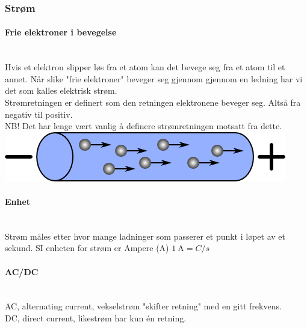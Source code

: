 \subsubsection{Strøm}
\paragraph{Frie elektroner i bevegelse} \mbox{} \\
Hvis et elektron slipper løs fra et atom kan det bevege seg fra et atom til et annet.
Når slike "frie elektroner" beveger seg gjennom gjennom en ledning
har vi det som kalles elektrisk strøm.
\\

Strømretningen er definert som den retningen elektronene beveger seg.
Altså fra negativ til positiv.\\
NB! Det har lenge vært vanlig å definere strømretningen motsatt fra dette.
\\
\includegraphics[scale=0.5]{./img/current}

\paragraph{Enhet} \mbox{} \\
Strøm måles etter hvor mange ladninger som passerer et punkt
i løpet av et sekund.
SI enheten for strøm er Ampere (A) \hfill $\SI{1}{\ampere} = C/s$

\paragraph{AC/DC} \mbox{} \\
AC, alternating current, vekselstrøm "skifter retning" med en gitt frekvens.\\
DC, direct current, likestrøm har kun én retning.
